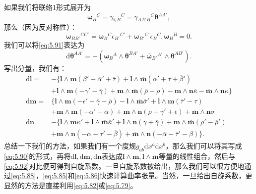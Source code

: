 如果我们将联络1形式展开为
\begin{equation*}
	\boldsymbol{\omega}{_{B}}^{C} =\gamma {_{\boldsymbol{i}_{1} B}}^{C} =\gamma {_{AA'B}}^{C}\boldsymbol{\theta}^{AA'} ,
\end{equation*}
那么（因为反对称性）：
\begin{equation*}
	\boldsymbol{\omega}{_{BB'}}^{CC'} =\boldsymbol{\omega}{_{B}}^{C} \epsilon {_{B'}}^{C'} +\overline{\boldsymbol{\omega}}{_{B'}}^{C'} \epsilon {_{B}}^{C} ,\boldsymbol{\omega}{_{B}}^{B} =0.
\end{equation*}
我们可以将\ref{eq:5.91}表达为
\begin{equation*}
	\mathrm{d}\boldsymbol{\theta}^{AA'} =-(\boldsymbol{\omega}{_{B}}^{A} \land \boldsymbol{\theta}^{BA'} +\overline{\boldsymbol{\omega}}{_{B'}}^{A'} \land \boldsymbol{\theta}^{AB'} ).
\end{equation*}
写出分量，我们有：
\begin{equation}
	\begin{aligned}
		\mathrm{d}\boldsymbol{l} = & -\{\boldsymbol{l} \land \boldsymbol{m}( \beta '+\overline{\alpha } '+\overline{\tau }) +\boldsymbol{l} \land \overline{\boldsymbol{m}}( \alpha '+\tau +\overline{\beta } ')\\
		& +\boldsymbol{l} \land \boldsymbol{m}( -\gamma '-\overline{\gamma }) +\boldsymbol{m} \land \overline{\boldsymbol{m}} (\overline{\rho } -\rho )-\boldsymbol{m} \land \boldsymbol{n}\overline{\kappa } -\overline{\boldsymbol{m}} \land \boldsymbol{n} \kappa \}\\
		\mathrm{d}\boldsymbol{m} = & \{\boldsymbol{l} \land \boldsymbol{m}( -\epsilon '-\overline{\gamma } -\overline{\rho }) -\boldsymbol{l} \land \overline{\boldsymbol{m}}\overline{\sigma } '+\boldsymbol{l} \land \boldsymbol{m}(\overline{\tau } '-\tau )\\
		& +\boldsymbol{m} \land \overline{\boldsymbol{m}}( -\alpha '-\overline{\alpha }) +\boldsymbol{m} \land \boldsymbol{n}( \rho +\gamma '+\overline{\epsilon }) +\overline{\boldsymbol{m}} \land \boldsymbol{n} \sigma \\
		\mathrm{d}\boldsymbol{n} = & -\{\boldsymbol{l} \land \boldsymbol{m} \kappa '+\boldsymbol{l} \land \overline{\boldsymbol{m}}\overline{\kappa } '+\boldsymbol{l} \land \boldsymbol{n} (\gamma +\overline{\gamma } )+\boldsymbol{m} \land \overline{\boldsymbol{m}}( \rho '-\overline{\rho } ')\\
		& +\boldsymbol{m} \land \boldsymbol{n}( -\alpha -\tau '-\overline{\beta }) +\overline{\boldsymbol{m}} \land \boldsymbol{n}( -\overline{\alpha } -\overline{\tau } '-\beta )\} .
	\end{aligned}
	\label{eq:5.92}
\end{equation}
总结一下我们的方法，如果我们有一个度规$g_{ab}\mathrm{d} x^{a}\mathrm{d} x^{b}$，那么我们可以将其写成\ref{eq:5.90}的形式，再将$\mathrm{d}\boldsymbol{l} ,\mathrm{d}\boldsymbol{m} ,\mathrm{d}\boldsymbol{n}$表达成$\boldsymbol{l} \land \boldsymbol{m} ,\boldsymbol{l} \land \overline{\boldsymbol{m}}$等量的线性组合，然后与\ref{eq:5.92}对比便可得到自旋系数。一旦自旋系数被给出，那么我们可以很方便地通过\ref{eq:5.88}，\ref{eq:5.85}和\ref{eq:5.86}快速计算曲率张量。当然，一旦给出自旋系数，更显然的方法是直接利用\ref{eq:5.82}或\ref{eq:5.79}。

